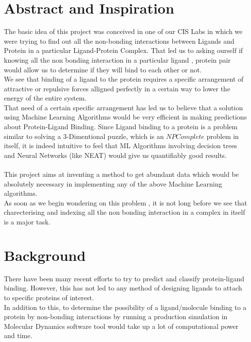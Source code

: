 \documentclass[12pt]{article}%
\begin{document}
\newpage


\section{Abstract and Inspiration}

The basic idea of this project was conceived in one of our CIS Labs in which we were trying to find out all the non-bonding interactions between  Ligands and Protein in a particular Ligand-Protein Complex. That led us to asking ourself if knowing all the non bonding interaction in a particular ligand , protein pair would allow us to determine if they will bind to each other or not. \\
We see that binding of a ligand to the protein requires a specific arrangement of attractive or repulsive forces alligned perfectly in a certain way to lower the energy of the entire system.\\
That need of a certain specific arrangement has led us to believe that a solution using Machine Learning Algorithms would be very efficient in making predictions about Protein-Ligand Binding.
Since Ligand binding to a protein is a problem similar to solving a 3-Dimentional puzzle, which is an $NP Complete$ problem in itself, it is indeed intuitive to feel that ML Algorithms involving decision trees and Neural Networks (like NEAT) would give us quantifiably good results.
\\\\
This project aims at inventing a method to get abundant data which would be absolutely necessary in implementing any of the above Machine Learning algorithms.\\
 

As soon as we begin wondering on this problem , it is not long before we see that charecterising and indexing all the non bonding interaction in a complex in itself is a major task. 

\section{Background}
There have been many recent efforts to try to predict and classify protein-ligand binding. However, this has
not led to any method of designing ligands to attach to specific proteins of interest. \\
In addition to this, to determine the possibility of a ligand/molecule binding to a protein by non-bonding
interactions by running a production simulation in Molecular Dynamics software tool would take up a lot
of computational power and time.
\end{document}
